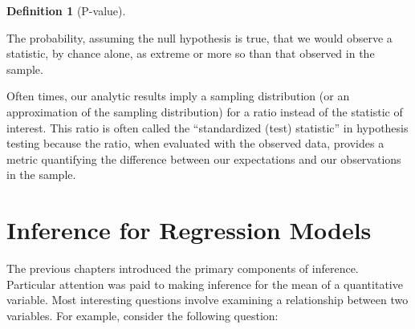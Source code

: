 \documentclass[
  letterpaper,
  DIV=11,
  numbers=noendperiod]{scrreprt}
\theoremstyle{definition}
\newtheorem{definition}{Definition}[chapter]
\theoremstyle{plain}
\theoremstyle{definition}
\theoremstyle{remark}
\begin{document}
\begin{definition}[P-value]\protect\hypertarget{def-pvalue}{}\label{def-pvalue}

The probability, assuming the null hypothesis is true, that we would
observe a statistic, by chance alone, as extreme or more so than that
observed in the sample.

\end{definition}

\begin{tcolorbox}[enhanced jigsaw, rightrule=.15mm, leftrule=.75mm, opacityback=0, coltitle=black, bottomrule=.15mm, opacitybacktitle=0.6, left=2mm, colframe=quarto-callout-note-color-frame, breakable, colback=white, arc=.35mm, toprule=.15mm, toptitle=1mm, bottomtitle=1mm, title=\textcolor{quarto-callout-note-color}{\faInfo}\hspace{0.5em}{Note}, titlerule=0mm, colbacktitle=quarto-callout-note-color!10!white]

Often times, our analytic results imply a sampling distribution (or an
approximation of the sampling distribution) for a ratio instead of the
statistic of interest. This ratio is often called the ``standardized
(test) statistic'' in hypothesis testing because the ratio, when
evaluated with the observed data, provides a metric quantifying the
difference between our expectations and our observations in the sample.

\end{tcolorbox}


\chapter{Inference for Regression Models}\label{sec-regression}

\providecommand{\norm}[1]{\left\lVert#1\right\rVert}
\providecommand{\abs}[1]{\left\lvert#1\right\rvert}
\providecommand{\dist}[1]{\stackrel{\text{#1}}{\sim}}
\providecommand{\ind}[1]{\mathbb{I}\left(#1\right)}
\providecommand{\bm}[1]{\mathbf{#1}}
\providecommand{\bs}[1]{\boldsymbol{#1}}
\providecommand{\Ell}{\mathcal{L}}
\providecommand{\indep}{\perp\negthickspace\negmedspace\perp}

The previous chapters introduced the primary components of inference.
Particular attention was paid to making inference for the mean of a
quantitative variable. Most interesting questions involve examining a
relationship between two variables. For example, consider the following
question:
\end{document}
